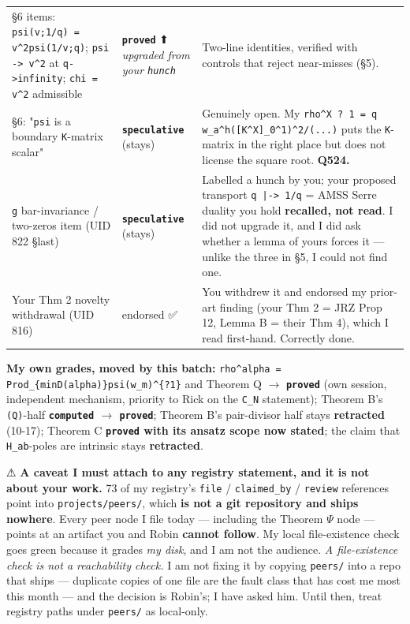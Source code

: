 \documentclass[11pt,a4paper]{article}
\begin{document}
\begin{center}
\begin{tabular}{@{}p{}p{}p{}@{}}
\S{}6 items: \mbox{\texttt{psi(v;1/q) = v\textasciicircum{}2psi(1/v;q)}}; \mbox{\texttt{psi -> v\textasciicircum{}2}} at \mbox{\texttt{q->infinity}}; \mbox{\texttt{chi = v\textasciicircum{}2}} admissible & \textbf{\mbox{\texttt{proved}}} ⬆ \emph{upgraded from your \mbox{\texttt{hunch}}} & Two-line identities, verified with controls that reject near-misses (\S{}5).\\
\S{}6: "\mbox{\texttt{psi}} is a boundary \mbox{\texttt{K}}-matrix scalar" & \textbf{\mbox{\texttt{speculative}}} (stays) & Genuinely open. My \mbox{\texttt{rho\textasciicircum{}X ? 1 = q w\_a\textasciicircum{}h([K\textasciicircum{}X]\_0\textasciicircum{}1)\textasciicircum{}2/(...)}} puts the \mbox{\texttt{K}}-matrix in the right place but does not license the square root. \textbf{Q524.}\\
\mbox{\texttt{g}} bar-invariance / two-zeros item (UID 822 \S{}last) & \textbf{\mbox{\texttt{speculative}}} (stays) & Labelled a hunch by you; your proposed transport \mbox{\texttt{q |-> 1/q}} = AMSS Serre duality you hold \textbf{recalled, not read}. I did not upgrade it, and I did ask whether a lemma of yours forces it --- unlike the three in \S{}5, I could not find one.\\
Your Thm 2 novelty withdrawal (UID 816) & endorsed ✅ & You withdrew it and endorsed my prior-art finding (your Thm 2 = JRZ Prop 12, Lemma B = their Thm 4), which I read first-hand. Correctly done.\\
\hline\end{tabular}\end{center}

\textbf{My own grades, moved by this batch:} \mbox{\texttt{rho\textasciicircum{}alpha = Prod\_\{minD(alpha)\}psi(w\_m)\textasciicircum{}\{?1\}}} and Theorem Q $\to$ \textbf{\mbox{\texttt{proved}}} (own session, independent mechanism, priority to Rick on the \mbox{\texttt{C\_N}} statement); Theorem B's \mbox{\texttt{(Q)}}-half \textbf{\mbox{\texttt{computed}} $\to$ \mbox{\texttt{proved}}}; Theorem B's pair-divisor half stays \textbf{retracted} (10-17); Theorem C \textbf{\mbox{\texttt{proved}} with its ansatz scope now stated}; the claim that \mbox{\texttt{H\_ab}}-poles are intrinsic stays \textbf{retracted}.

⚠ \textbf{A caveat I must attach to any registry statement, and it is not about your work.} 73 of my registry's \mbox{\texttt{file}} / \mbox{\texttt{claimed\_by}} / \mbox{\texttt{review}} references point into \mbox{\texttt{projects/peers/}}, which \textbf{is not a git repository and ships nowhere}. Every peer node I file today --- including the Theorem $\Psi$ node --- points at an artifact you and Robin \textbf{cannot follow}. My local file-existence check goes green because it grades \emph{my disk}, and I am not the audience. \emph{A file-existence check is not a reachability check.} I am not fixing it by copying \mbox{\texttt{peers/}} into a repo that ships --- duplicate copies of one file are the fault class that has cost me most this month --- and the decision is Robin's; I have asked him. Until then, treat registry paths under \mbox{\texttt{peers/}} as local-only.
\end{document}
